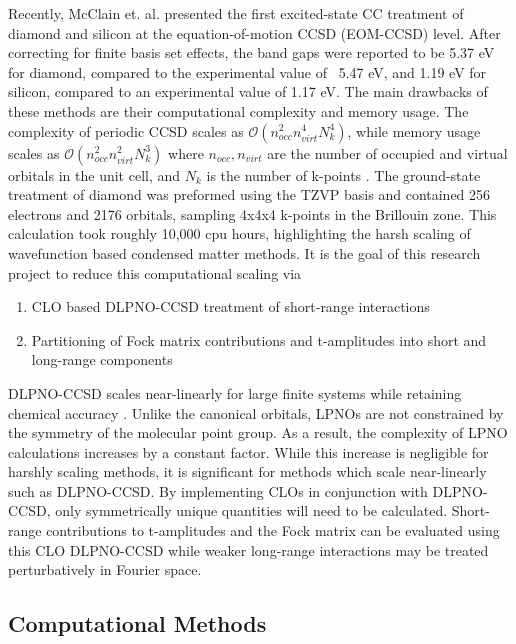 \documentclass[letterpaper, 12pt]{article}
\begin{document}
Recently, McClain et. al. \cite{solidCCSD} presented the first excited-state CC treatment of diamond and silicon at the equation-of-motion CCSD (EOM-CCSD) level. After correcting for finite basis set effects, the band gaps were reported to be 5.37 \si{\eV} for diamond, compared to the experimental value of ~5.47 \si{\eV}, and 1.19 \si{\eV} for silicon, compared to an experimental value of 1.17 \si{\eV}. The main drawbacks of these methods are their computational complexity and memory usage. The complexity of periodic CCSD scales as $\mathcal{O}(n^2_{occ} n^4_{virt}N^4_k)$, while memory usage scales as $\mathcal{O}(n^2_{occ} n^2_{virt}N^3_k)$ where  $n_{occ}, n_{virt}$ are the number of occupied and virtual orbitals in the unit cell, and $N_k$ is the number of k-points \cite{solidCCSD}. The ground-state treatment of diamond was preformed using the TZVP basis and contained 256 electrons and 2176 orbitals, sampling 4x4x4 k-points in the Brillouin zone. This calculation took roughly 10,000 cpu hours, highlighting the harsh scaling of wavefunction based condensed matter methods. It is the goal of this research project to reduce this computational scaling via 
\begin{enumerate}
\item CLO based DLPNO-CCSD treatment of short-range interactions
\item Partitioning of Fock matrix contributions and t-amplitudes into short and long-range components
\end{enumerate} 
DLPNO-CCSD scales near-linearly for large finite systems while retaining chemical accuracy \cite{DLPNOCC}. Unlike the canonical orbitals, LPNOs are not constrained by the symmetry of the molecular point group. As a result, the complexity of LPNO calculations increases by a constant factor. While this increase is negligible for harshly scaling methods, it is significant for methods which scale near-linearly such as DLPNO-CCSD. By implementing CLOs in conjunction with DLPNO-CCSD, only symmetrically unique quantities will need to be calculated. Short-range contributions to t-amplitudes and the Fock matrix can be evaluated using this CLO DLPNO-CCSD while weaker long-range interactions may be treated perturbatively in Fourier space.

\subsection{Computational Methods}
\end{document}
